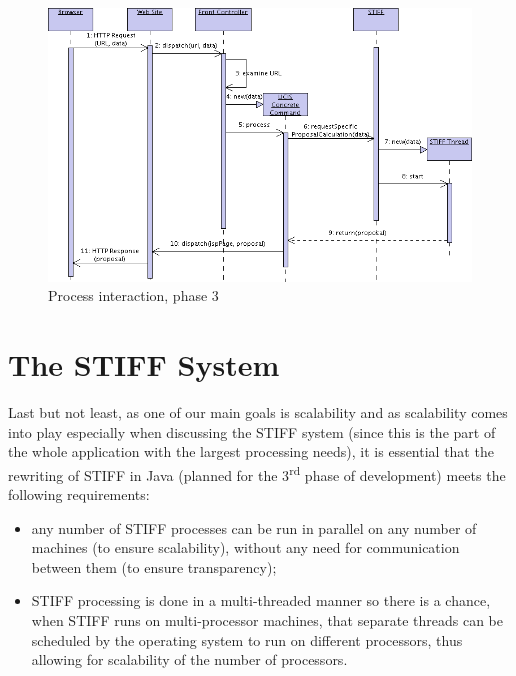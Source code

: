 \begin{figure}[ht]
\begin{center}
\includegraphics[width=\linewidth]{img/pi_3.png}
\end{center}
\caption{Process interaction, phase 3}
\label{fig:pi_3}
\end{figure}

\section{The STIFF System}
\label{sec:pv_stiff}

Last but not least, as one of our main goals is scalability and as scalability comes into play especially
when discussing the STIFF system (since this is the part of the whole application with the largest
processing needs), it is essential that the rewriting of STIFF in Java (planned for the 3\textsuperscript{rd}
phase of development) meets the following requirements:

\begin{itemize}
\item any number of STIFF processes can be run in parallel on any number of machines (to ensure
scalability), without any need for communication between them (to ensure transparency);
\item STIFF processing is done in a multi-threaded manner so there is a chance, when STIFF runs on
multi-processor machines, that separate threads can be scheduled by the operating system to run on
different processors, thus allowing for scalability of the number of processors.
\end{itemize}


